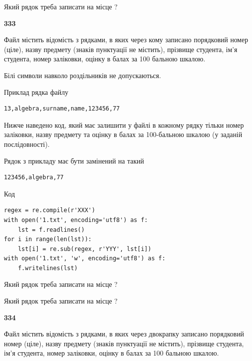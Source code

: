 Який рядок треба записати на місце  ?\par


\newpage

{\begin {center}\textbf{ 333}\end {center}}\par
Файл  містить відомість з рядками, в яких через кому записа\-но поряд\-ковий номер (ціле), назву предмету (знаків пунктуації не містить), прізвище студента, ім'я студента, номер заліковки, оцінку в балах за 100 бальною шкалою.

Білі символи навколо роздільників не допускаються.

Приклад рядка файлу



\begin{verbatim}
13,algebra,surname,name,123456,77
\end{verbatim}


Нижче наведено код, який має залишити у файлі в кожному рядку тільки номер заліковки, назву предмету та оцінку в балах за 100-бальною шкалою (у заданій послі\-дов\-ності).

Рядок з прикладу має бути замінений на такий



\begin{verbatim}
123456,algebra,77
\end{verbatim}




Код



\begin{verbatim}
regex = re.compile(r'XXX')
with open('1.txt', encoding='utf8') as f:
    lst = f.readlines()
for i in range(len(lst)):
    lst[i] = re.sub(regex, r'YYY', lst[i])
with open('1.txt', 'w', encoding='utf8') as f:
    f.writelines(lst)
\end{verbatim}







Який рядок треба записати на місце  ?\par
\vspace{5mm}


Який рядок треба записати на місце  ?\par


\newpage

{\begin {center}\textbf{ 334}\end {center}}\par
Файл  містить відомість з рядками, в яких через двокрапку записа\-но поряд\-ковий номер (ціле), назву предмету (знаків пунктуації не містить), прізвище студента, ім'я студента, номер заліковки, оцінку в балах за 100 бальною шкалою.

